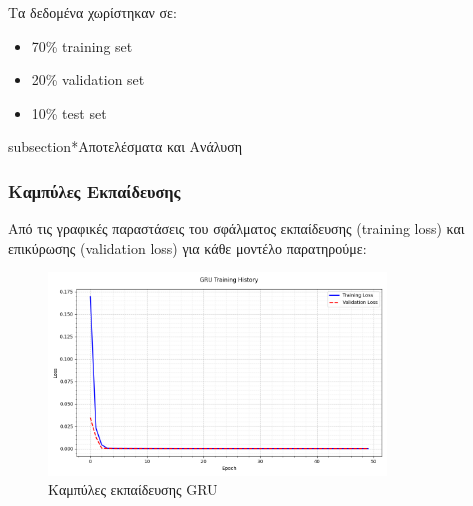 \documentclass[a4paper,12pt]{article}
\begin{document}
Τα δεδομένα χωρίστηκαν σε:
\begin{itemize}
    \item 70\% training set
    \item 20\% validation set
    \item 10\% test set
\end{itemize}

subsection*{Αποτελέσματα και Ανάλυση}


\subsubsection*{Καμπύλες Εκπαίδευσης}

Από τις γραφικές παραστάσεις του σφάλματος εκπαίδευσης (training loss) και επικύρωσης (validation loss) για κάθε μοντέλο παρατηρούμε:

\begin{figure}[h]
    \centering
    \includegraphics[width=0.8\textwidth]{gru_loss.png}
    \caption{Καμπύλες εκπαίδευσης GRU}
    \label{fig:gru_history}
\end{figure}
\end{document}
